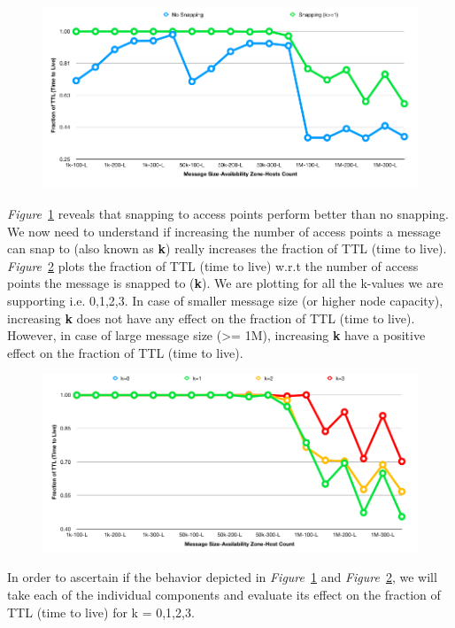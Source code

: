 {\begin{figure}[H]
  \centering
  \includegraphics[scale=0.45]{./figures/scenario2_1_all_parameters}
  \label{fig:scenario2_1_all_parameters}
\end{figure}
\vspace{3mm}
\emph{Figure}~\ref{fig:scenario2_1_all_parameters} reveals that snapping to access points perform better than no snapping. We now need to understand if increasing the number of access points a message can snap to (also known as \textbf{k}) really increases the fraction of TTL (time to live). \newline \newline
\emph{Figure}~\ref{fig:scenario2_1_2_all_parameters} plots the fraction of TTL (time to live) w.r.t the number of access points the message is snapped to (\textbf{k}). We are plotting for all the k-values we are supporting i.e. 0,1,2,3. In case of smaller message size (or higher node capacity), increasing \textbf{k} does not have any effect on the fraction of TTL (time to live). However, in case of large message size (>= 1M), increasing \textbf{k} have a positive effect on the fraction of TTL (time to live).
\begin{figure}[H]
  \centering
  \includegraphics[scale=0.45]{./figures/scenario2_1_2_all_parameters}
  \label{fig:scenario2_1_2_all_parameters}
\end{figure}
\vspace{3mm}
In order to ascertain if the behavior depicted in \emph{Figure}~\ref{fig:scenario2_1_all_parameters} and \emph{Figure}~\ref{fig:scenario2_1_2_all_parameters}, we will take each of the individual components and evaluate its effect on the fraction of TTL (time to live) for k = 0,1,2,3.

}
